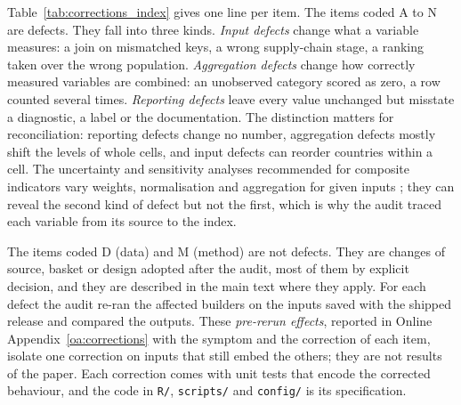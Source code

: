 Table~\ref{tab:corrections_index} gives one line per item. The items coded A to N are defects.
They fall into three kinds. \emph{Input defects} change what a variable measures: a join on
mismatched keys, a wrong supply-chain stage, a ranking taken over the wrong population.
\emph{Aggregation defects} change how correctly measured variables are combined: an unobserved
category scored as zero, a row counted several times. \emph{Reporting defects} leave every value
unchanged but misstate a diagnostic, a label or the documentation. The distinction matters for
reconciliation: reporting defects change no number, aggregation defects mostly shift the levels of
whole cells, and input defects can reorder countries within a cell. The uncertainty and sensitivity
analyses recommended for composite indicators vary weights, normalisation and aggregation for given
inputs \citep{saisana2005uncertainty,oecd2008handbook}; they can reveal the second kind of defect
but not the first, which is why the audit traced each variable from its source to the index.

The items coded D (data) and M (method) are not defects. They are changes of source, basket or
design adopted after the audit, most of them by explicit decision, and they are described in the
main text where they apply. For each defect the audit re-ran the affected builders on the inputs
saved with the shipped release and compared the outputs. These \emph{pre-rerun effects}, reported
in Online Appendix~\ref{oa:corrections} with the symptom and the correction of each item, isolate
one correction on inputs that still embed the others; they are not results of the paper. Each
correction comes with unit tests that encode the corrected behaviour, and the code in \texttt{R/},
\texttt{scripts/} and \texttt{config/} is its specification.

